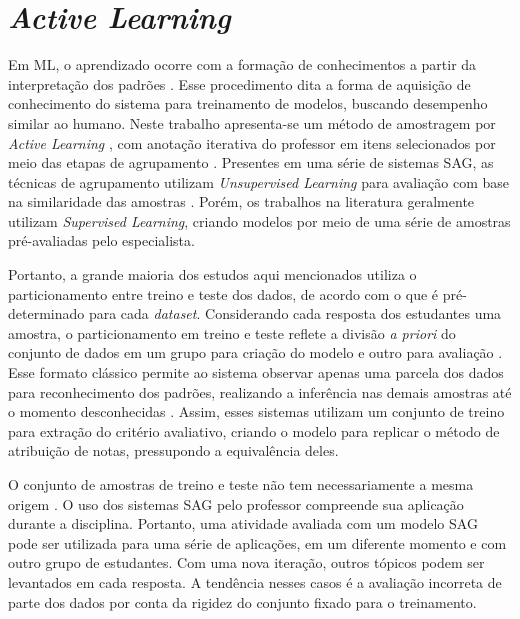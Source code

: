 \section{\textit{Active Learning}}

Em ML, o aprendizado ocorre com a formação de conhecimentos a partir da interpretação dos padrões \cite{bishop2006}. Esse procedimento dita a forma de aquisição de conhecimento do sistema para treinamento de modelos, buscando desempenho similar ao humano. Neste trabalho apresenta-se um método de amostragem por \textit{Active Learning} \cite{miller2020, kumar2020}, com anotação iterativa do professor em itens selecionados por meio das etapas de agrupamento \cite{horbach2018}. Presentes em uma série de sistemas SAG, as técnicas de agrupamento utilizam \textit{Unsupervised Learning} para avaliação com base na similaridade das amostras \cite{basu2013, zhang2016, marvaniya2018}. Porém, os trabalhos na literatura geralmente utilizam \textit{Supervised Learning}, criando modelos por meio de uma série de amostras pré-avaliadas pelo especialista.

Portanto, a grande maioria dos estudos aqui mencionados utiliza o particionamento entre treino e teste dos dados, de acordo com o que é pré-determinado para cada \textit{dataset}. Considerando cada resposta dos estudantes uma amostra, o particionamento em treino e teste reflete a divisão \textit{a priori} do conjunto de dados em um grupo para criação do modelo e outro para avaliação \cite{heilman2015}. Esse formato clássico permite ao sistema observar apenas uma parcela dos dados para reconhecimento dos padrões, realizando a inferência nas demais amostras até o momento desconhecidas \cite{bishop2006}. Assim, esses sistemas utilizam um conjunto de treino para extração do critério avaliativo, criando o modelo para replicar o método de atribuição de notas, pressupondo a equivalência deles.

O conjunto de amostras de treino e teste não tem necessariamente a mesma origem \cite{sung2019a}. O uso dos sistemas SAG pelo professor compreende sua aplicação durante a disciplina. Portanto, uma atividade avaliada com um modelo SAG pode ser utilizada para uma série de aplicações, em um diferente momento e com outro grupo de estudantes. Com uma nova iteração, outros tópicos podem ser levantados em cada resposta. A tendência nesses casos é a avaliação incorreta de parte dos dados por conta da rigidez do conjunto fixado para o treinamento.

